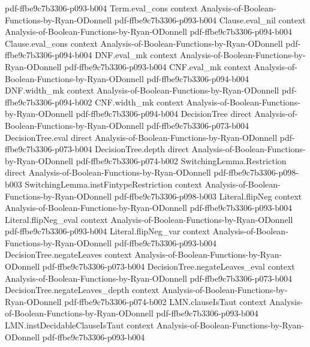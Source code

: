 \begin{lemma}
  {pdf-ffbe9c7b3306-p093-b004}
\proofstep
  {Term.eval_cons}
  {context}
  {Analysis-of-Boolean-Functions-by-Ryan-ODonnell}
  {pdf-ffbe9c7b3306-p093-b004}
\proofstep
  {Clause.eval_nil}
  {context}
  {Analysis-of-Boolean-Functions-by-Ryan-ODonnell}
  {pdf-ffbe9c7b3306-p094-b004}
\proofstep
  {Clause.eval_cons}
  {context}
  {Analysis-of-Boolean-Functions-by-Ryan-ODonnell}
  {pdf-ffbe9c7b3306-p094-b004}
\proofstep
  {DNF.eval_mk}
  {context}
  {Analysis-of-Boolean-Functions-by-Ryan-ODonnell}
  {pdf-ffbe9c7b3306-p093-b004}
\proofstep
  {CNF.eval_mk}
  {context}
  {Analysis-of-Boolean-Functions-by-Ryan-ODonnell}
  {pdf-ffbe9c7b3306-p094-b004}
\proofstep
  {DNF.width_mk}
  {context}
  {Analysis-of-Boolean-Functions-by-Ryan-ODonnell}
  {pdf-ffbe9c7b3306-p094-b002}
\proofstep
  {CNF.width_mk}
  {context}
  {Analysis-of-Boolean-Functions-by-Ryan-ODonnell}
  {pdf-ffbe9c7b3306-p094-b004}
\proofstep
  {DecisionTree}
  {direct}
  {Analysis-of-Boolean-Functions-by-Ryan-ODonnell}
  {pdf-ffbe9c7b3306-p073-b004}
\proofstep
  {DecisionTree.eval}
  {direct}
  {Analysis-of-Boolean-Functions-by-Ryan-ODonnell}
  {pdf-ffbe9c7b3306-p073-b004}
\proofstep
  {DecisionTree.depth}
  {direct}
  {Analysis-of-Boolean-Functions-by-Ryan-ODonnell}
  {pdf-ffbe9c7b3306-p074-b002}
\proofstep
  {SwitchingLemma.Restriction}
  {direct}
  {Analysis-of-Boolean-Functions-by-Ryan-ODonnell}
  {pdf-ffbe9c7b3306-p098-b003}
\proofstep
  {SwitchingLemma.instFintypeRestriction}
  {context}
  {Analysis-of-Boolean-Functions-by-Ryan-ODonnell}
  {pdf-ffbe9c7b3306-p098-b003}
\proofstep
  {Literal.flipNeg}
  {context}
  {Analysis-of-Boolean-Functions-by-Ryan-ODonnell}
  {pdf-ffbe9c7b3306-p093-b004}
\proofstep
  {Literal.flipNeg_eval}
  {context}
  {Analysis-of-Boolean-Functions-by-Ryan-ODonnell}
  {pdf-ffbe9c7b3306-p093-b004}
\proofstep
  {Literal.flipNeg_var}
  {context}
  {Analysis-of-Boolean-Functions-by-Ryan-ODonnell}
  {pdf-ffbe9c7b3306-p093-b004}
\proofstep
  {DecisionTree.negateLeaves}
  {context}
  {Analysis-of-Boolean-Functions-by-Ryan-ODonnell}
  {pdf-ffbe9c7b3306-p073-b004}
\proofstep
  {DecisionTree.negateLeaves_eval}
  {context}
  {Analysis-of-Boolean-Functions-by-Ryan-ODonnell}
  {pdf-ffbe9c7b3306-p073-b004}
\proofstep
  {DecisionTree.negateLeaves_depth}
  {context}
  {Analysis-of-Boolean-Functions-by-Ryan-ODonnell}
  {pdf-ffbe9c7b3306-p074-b002}
\proofstep
  {LMN.clauseIsTaut}
  {context}
  {Analysis-of-Boolean-Functions-by-Ryan-ODonnell}
  {pdf-ffbe9c7b3306-p093-b004}
\proofstep
  {LMN.instDecidableClauseIsTaut}
  {context}
  {Analysis-of-Boolean-Functions-by-Ryan-ODonnell}
  {pdf-ffbe9c7b3306-p093-b004}

\end{lemma}
